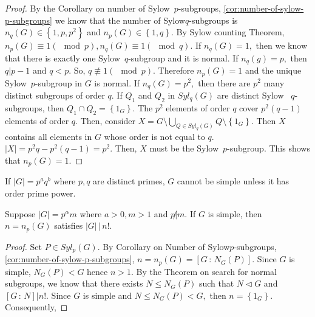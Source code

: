 \begin{theorem}
\end{theorem}

\begin{proof}
	By the Corollary on number of Sylow~$p$\nobreakdash-subgroups, 
	\cref{cor:number-of-sylow-p-subgroups} we know that the number of
	Sylow$q$\nobreakdash-subgroups is $n_q(G) \in \left\{ 1, p, p^2 \right\} $ and
	$n_p(G) \in \left\{ 1, q \right\} .$ By Sylow counting Theorem,
	$n_p(G) \equiv 1 (\mod p ), n_q(G) \equiv 1 (\mod q ).$ If $n_q(G) = 1,$
	then we know that there is exactly one Sylow~$q$\nobreakdash-subgroup
	and it is normal.
	If $n_q(g) = p,$ then $q | p-1$ and $ q < p.$ So, $q \not \equiv 1 
	(\mod p).$ Therefore $n_p(G) = 1$ and the unique Sylow~$p$\nobreakdash-subgroup
	in $G$ is normal. If $n_q(G) = p^2,$ then there are $p^2$ many distinct
	subgroups of order $q.$ If $Q_1$ and $Q_2$ in $Syl_q(G)$ are distinct Sylow~
	$q$\nobreakdash-subgroups, then $Q_1 \cap Q_2 = \left\{ 1_G \right\} .$
	The $p^2$ elements of order $q$ cover $p^2(q-1)$ elements of order $q.$
	Then, consider $X = G \setminus \bigcup_{Q \in Syl_q(G)} Q \setminus \left\{ 
	1_G\right\} .$ Then $X$ contains all elements in $G$ whose order is not equal to 
	$q.$ $ \lvert X \rvert = p^2 q - p^2(q-1) = p^2.$ Then,
	$X$ must be the Sylow~$p$\nobreakdash-subgroup. This shows that
	$n_p(G) = 1.$
\end{proof}

\begin{remark}[Burnside]
	If $ \lvert G \rvert = p^a q^b$ where $p,q$ are distinct primes, $G$ cannot
	be simple unless it has order prime power.
\end{remark}


\begin{lemma}
	Suppose $ \lvert G \rvert = p^\alpha m$ where $a >0, m>1$ and $
	p \not | m.$ If $ G$ is simple, then $n = n_p(G) $ satisfies $ \lvert G \rvert
	\, | \, n!. $
\end{lemma}

\begin{proof}
	Set $P \in Syl_p(G)$. By Corollary on Number of Sylow$p$\nobreakdash-subgroups,
	\cref{cor:number-of-sylow-p-subgroups},
	$n = n_p(G) = \left[ G \, : \, N_G(P) \right] .$ Since $G$ is simple, 
	$N_G(P) < G$ hence $ n >1.$ By the Theorem on search for normal subgroups,
	we know that there exists $N \leq N_G(P) $ such that $ N \triangleleft G$
	and $ \left[ G \, : \, N \right] | n!.$ Since $G$ is simple and $N \leq N_G(P) 
	< G,$ then $n = \left\{ 1_G \right\} .$ Consequently, 
\end{proof}

